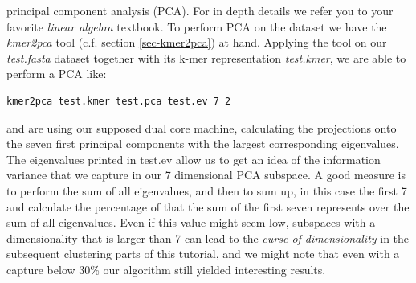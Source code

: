 principal component analysis (PCA). For in depth details we refer you
to your favorite \emph{linear algebra} textbook. To perform
PCA on the dataset we have the \emph{kmer2pca} tool (c.f. section
\ref{sec-kmer2pca}) at hand. Applying the tool on our 
\emph{test.fasta} dataset together with its k-mer representation
\emph{test.kmer}, we are able to perform a PCA like:
\begin{lstlisting}
kmer2pca test.kmer test.pca test.ev 7 2
\end{lstlisting}
and are using our supposed dual core machine, calculating the
projections onto the seven first principal components with the largest
corresponding eigenvalues. The eigenvalues printed in test.ev allow us
to get an idea of the information variance that we capture in
our 7 dimensional PCA subspace. A good measure is to perform the sum
of all eigenvalues, and then to sum up, in this case the first 7 and
calculate the percentage of that the sum of the first seven represents
over the sum of all eigenvalues. Even if this value might seem low,
subspaces with a dimensionality that is larger than 7 can lead to the
\emph{curse of dimensionality} in the subsequent clustering parts of this
tutorial, and we might note that even with a capture below 30\% our
algorithm still yielded interesting results.

